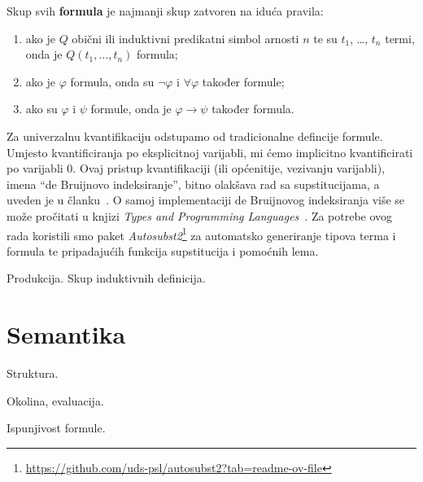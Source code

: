 \begin{definition}\label{def:formula}
  Skup svih \textbf{formula} je najmanji skup zatvoren na iduća pravila:
  \begin{enumerate}
  \item ako je \(Q\) obični ili induktivni predikatni simbol arnosti \(n\) te su \(t_{1}\), \ldots, \(t_{n}\) termi,
    onda je \(Q(t_{1}, \ldots, t_{n})\) formula;
  \item ako je \(\varphi\) formula, onda su \(\neg\varphi\) i \(\forall\varphi\) također formule;
  \item ako su \(\varphi\) i \(\psi\) formule, onda je \(\varphi \rightarrow \psi\) također formula.
  \end{enumerate}
\end{definition}
\noindent Za univerzalnu kvantifikaciju odstupamo od tradicionalne defincije formule.
Umjesto kvantificiranja po eksplicitnoj varijabli,
mi ćemo implicitno kvantificirati po varijabli \(0\).
Ovaj pristup kvantifikaciji (ili općenitije, vezivanju varijabli), imena ``de Bruijnovo indeksiranje'', bitno olakšava rad sa supstitucijama, a uveden je u članku~\cite{debruijnamelessdummies}.
O samoj implementaciji de Bruijnovog indeksiranja više se može pročitati u knjizi
\textit{Types and Programming Languages}~\cite{pierce2002tapl}.
Za potrebe ovog rada koristili smo paket \textit{Autosubst2}\footnote{\url{https://github.com/uds-psl/autosubst2?tab=readme-ov-file}} za automatsko generiranje tipova terma i formula te
pripadajućih funkcija supstitucija i pomoćnih lema.

\begin{definition}
  Produkcija. Skup induktivnih definicija.
\end{definition}

\section{Semantika}\label{sec:semantika}
\begin{definition}
  Struktura.
\end{definition}

\begin{definition}
  Okolina, evaluacija.
\end{definition}

\begin{definition}
  Ispunjivost formule.
\end{definition}

